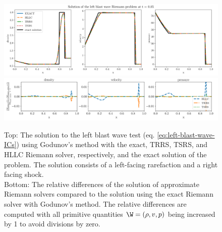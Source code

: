 \begin{figure}
    \centering
    \includegraphics[width=\textwidth]{
    ./figures/FV/godunov_euler/GODUNOV-left_blast_wave-1D.png} %
    \includegraphics[width=\textwidth]{
    ./figures/FV/godunov_euler/GODUNOV-left_blast_wave-differences-1D.png} %
    \caption[Left blast wave solution using Godunov's method]{
Top: The solution to the left blast wave test (eq. \ref{eq:left-blast-wave-ICs}) using Godunov's
method with the exact, TRRS, TSRS, and HLLC Riemann solver, respectively, and the exact solution
of the problem.  The solution consists of a left-facing rarefaction and a right facing shock. \\
Bottom: The relative differences of the solution of approximate Riemann solvers compared to the
solution using the exact Riemann solver with Godunov's method. The relative differences are
computed with all primitive quantities $\W = (\rho, v, p)$ being increased by 1 to avoid
divisions by zero.
    }%
    \label{fig:godunov-left-blast-wave}
\end{figure}
%
